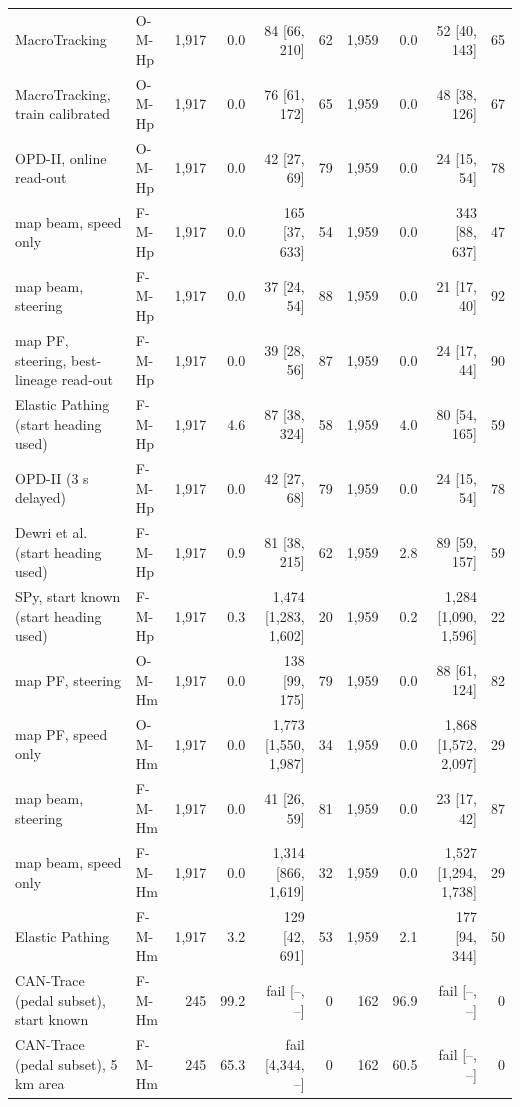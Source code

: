 \begin{table}[t]
\begin{tabular}{llrrrrrrrr}
MacroTracking & O-M-Hp & 1{,}917 & 0.0 & 84 [66, 210] & 62 & 1{,}959 & 0.0 & 52 [40, 143] & 65 \\
MacroTracking, train calibrated & O-M-Hp & 1{,}917 & 0.0 & 76 [61, 172] & 65 & 1{,}959 & 0.0 & 48 [38, 126] & 67 \\
OPD-II, online read-out & O-M-Hp & 1{,}917 & 0.0 & 42 [27, 69] & 79 & 1{,}959 & 0.0 & 24 [15, 54] & 78 \\
map beam, speed only & F-M-Hp & 1{,}917 & 0.0 & 165 [37, 633] & 54 & 1{,}959 & 0.0 & 343 [88, 637] & 47 \\
map beam, steering & F-M-Hp & 1{,}917 & 0.0 & 37 [24, 54] & 88 & 1{,}959 & 0.0 & 21 [17, 40] & 92 \\
map PF, steering, best-lineage read-out & F-M-Hp & 1{,}917 & 0.0 & 39 [28, 56] & 87 & 1{,}959 & 0.0 & 24 [17, 44] & 90 \\
Elastic Pathing (start heading used) & F-M-Hp & 1{,}917 & 4.6 & 87 [38, 324] & 58 & 1{,}959 & 4.0 & 80 [54, 165] & 59 \\
OPD-II (3 s delayed) & F-M-Hp & 1{,}917 & 0.0 & 42 [27, 68] & 79 & 1{,}959 & 0.0 & 24 [15, 54] & 78 \\
Dewri et al. (start heading used) & F-M-Hp & 1{,}917 & 0.9 & 81 [38, 215] & 62 & 1{,}959 & 2.8 & 89 [59, 157] & 59 \\
SPy, start known (start heading used) & F-M-Hp & 1{,}917 & 0.3 & 1{,}474 [1{,}283, 1{,}602] & 20 & 1{,}959 & 0.2 & 1{,}284 [1{,}090, 1{,}596] & 22 \\
map PF, steering & O-M-Hm & 1{,}917 & 0.0 & 138 [99, 175] & 79 & 1{,}959 & 0.0 & 88 [61, 124] & 82 \\
map PF, speed only & O-M-Hm & 1{,}917 & 0.0 & 1{,}773 [1{,}550, 1{,}987] & 34 & 1{,}959 & 0.0 & 1{,}868 [1{,}572, 2{,}097] & 29 \\
map beam, steering & F-M-Hm & 1{,}917 & 0.0 & 41 [26, 59] & 81 & 1{,}959 & 0.0 & 23 [17, 42] & 87 \\
map beam, speed only & F-M-Hm & 1{,}917 & 0.0 & 1{,}314 [866, 1{,}619] & 32 & 1{,}959 & 0.0 & 1{,}527 [1{,}294, 1{,}738] & 29 \\
Elastic Pathing & F-M-Hm & 1{,}917 & 3.2 & 129 [42, 691] & 53 & 1{,}959 & 2.1 & 177 [94, 344] & 50 \\
CAN-Trace (pedal subset), start known & F-M-Hm & 245 & 99.2 & fail [--, --] & 0 & 162 & 96.9 & fail [--, --] & 0 \\
CAN-Trace (pedal subset), 5 km area & F-M-Hm & 245 & 65.3 & fail [4{,}344, --] & 0 & 162 & 60.5 & fail [--, --] & 0 \\

\end{tabular}
\end{table}

